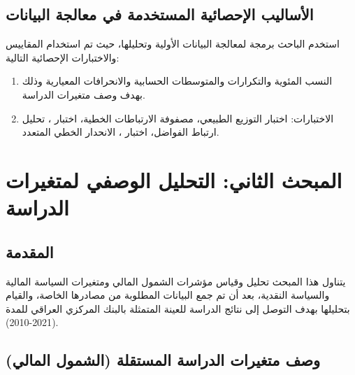 \documentclass[10pt,a4paper]{report}
\begin{document}
\begin{doublespacing}
\subsection{الأساليب الإحصائية المستخدمة في معالجة البيانات}
استخدم الباحث برمجة  لمعالجة البيانات الأولية وتحليلها، حيث تم استخدام المقاييس والاختبارات الإحصائية التالية:
\begin{enumerate}
	\item  النسب المئوية والتكرارات والمتوسطات الحسابية والانحرافات المعيارية وذلك بهدف وصف متغيرات الدراسة.
	\item  الاختبارات: اختبار التوزيع الطبيعي، مصفوفة الارتباطات الخطية، اختبار ، تحليل ارتباط الفواضل، اختبار ، الانحدار الخطي المتعدد.
\end{enumerate}
\clearpage
\section{المبحث الثاني: التحليل الوصفي لمتغيرات الدراسة}
\subsection{المقدمة}
يتناول هذا المبحث تحليل وقياس مؤشرات الشمول المالي ومتغيرات السياسة المالية والسياسة النقدية، بعد أن تم جمع البيانات المطلوبة من مصادرها الخاصة، والقيام بتحليلها بهدف التوصل إلى نتائج الدراسة للعينة المتمثلة بالبنك المركزي العراقي للمدة (2021-2010).
\subsection{وصف متغيرات الدراسة المستقلة (الشمول المالي)}

\end{doublespacing}
\end{document}
